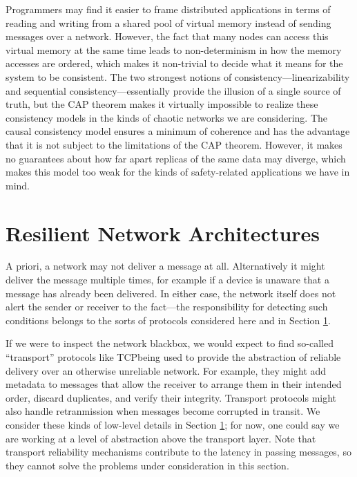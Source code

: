 \documentclass[]             %
{NASA}                       %
\theoremstyle{definition}
\begin{document}
Programmers may find it easier to frame distributed applications in
terms of reading and writing from a shared pool of virtual memory
instead of sending messages over a network. However, the fact that
many nodes can access this virtual memory at the same time leads to
non-determinism in how the memory accesses are ordered, which makes it
non-trivial to decide what it means for the system to be
consistent. The two strongest notions of consistency---linearizability
and sequential consistency---essentially provide the illusion of a
single source of truth, but the CAP theorem makes it virtually
impossible to realize these consistency models in the kinds of chaotic
networks we are considering. The causal consistency model ensures a
minimum of coherence and has the advantage that it is not subject to
the limitations of the CAP theorem. However, it makes no guarantees
about how far apart replicas of the same data may diverge, which makes
this model too weak for the kinds of safety-related applications we
have in mind.

\section{Resilient Network Architectures}
\label{sec:networking}



A priori, a network may not deliver a message at all. Alternatively it
might deliver the message multiple times, for example if a device is
unaware that a message has already been delivered. In either case, the
network itself does not alert the sender or receiver to the fact---the
responsibility for detecting such conditions belongs to the sorts of
protocols considered here and in Section \ref{sec:networking}.

If we were to inspect the network blackbox, we would expect to find
so-called ``transport'' protocols like TCP\citationneeded being used
to provide the abstraction of reliable delivery over an otherwise
unreliable network. For example, they might add metadata to messages
that allow the receiver to arrange them in their intended order,
discard duplicates, and verify their integrity. Transport protocols
might also handle retranmission when messages become corrupted in
transit. We consider these kinds of low-level details in Section
\ref{sec:networking}; for now, one could say we are working at a level
of abstraction above the transport layer. Note that transport
reliability mechanisms contribute to the latency in passing messages,
so they cannot solve the problems under consideration in this section.
\end{document}

